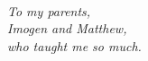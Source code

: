 \newpage
\thispagestyle{empty}
~
\vfill
\begin{center}
\itshape%
To my parents,\\
Imogen and Matthew,\\
who taught me so much.
\end{center}
\vfill
~
\newpage
\thispagestyle{empty}
~